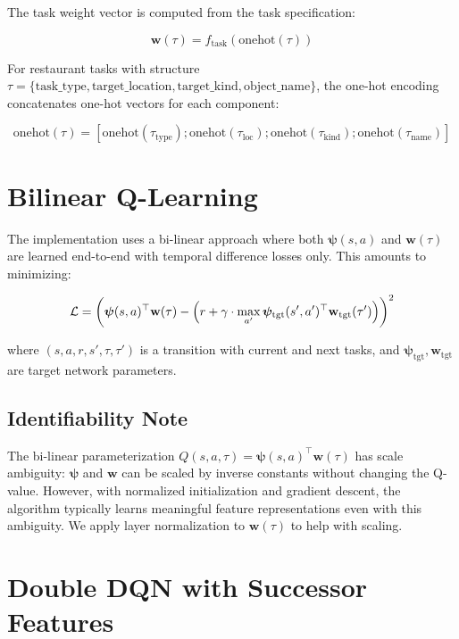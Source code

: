 \documentclass[11pt]{article}
\begin{document}
The task weight vector is computed from the task specification:

\begin{equation}
\mathbf{w}(\tau) = f_{\text{task}}(\text{onehot}(\tau))
\end{equation}

For restaurant tasks with structure $\tau = \{\text{task\_type}, \text{target\_location}, \text{target\_kind}, \text{object\_name}\}$, the one-hot encoding concatenates one-hot vectors for each component:

\begin{equation}
\text{onehot}(\tau) = [\text{onehot}(\tau_{\text{type}}); \text{onehot}(\tau_{\text{loc}}); \text{onehot}(\tau_{\text{kind}}); \text{onehot}(\tau_{\text{name}})]
\end{equation}

\section{Bilinear Q-Learning}

The implementation uses a bi-linear approach where both $\bm{\psi}(s, a)$ and $\mathbf{w}(\tau)$ are learned end-to-end with temporal difference losses only. This amounts to minimizing:

\begin{equation}
\mathcal{L} = \biggl(\bm{\psi}(s, a)^\top \mathbf{w}(\tau) - \Bigl(r + \gamma \cdot \max_{a'} \bm{\psi}_{\text{tgt}}(s', a')^\top \mathbf{w}_{\text{tgt}}(\tau')\Bigr)\biggr)^2
\end{equation}

where $(s, a, r, s', \tau, \tau')$ is a transition with current and next tasks, and $\bm{\psi}_{\text{tgt}}, \mathbf{w}_{\text{tgt}}$ are target network parameters.

\subsection{Identifiability Note}

The bi-linear parameterization $Q(s, a, \tau) = \bm{\psi}(s, a)^\top \mathbf{w}(\tau)$ has scale ambiguity: $\bm{\psi}$ and $\mathbf{w}$ can be scaled by inverse constants without changing the Q-value. However, with normalized initialization and gradient descent, the algorithm typically learns meaningful feature representations even with this ambiguity. We apply layer normalization to $\mathbf{w}(\tau)$ to help with scaling.

\section{Double DQN with Successor Features}
\end{document}
